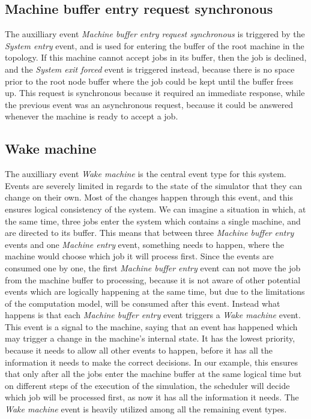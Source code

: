 \subsection{Machine buffer entry request synchronous}
The auxilliary event \textit{Machine buffer entry request synchronous} is triggered by the \textit{System entry} event, and is used for entering the buffer of the root machine in the topology. If this machine cannot accept jobs in its buffer, then the job is declined, and the \textit{System exit forced} event is triggered instead, because there is no space prior to the root node buffer where the job could be kept until the buffer frees up. This request is synchronous because it required an immediate response, while the previous event was an asynchronous request, because it could be answered whenever the machine is ready to accept a job.

\subsection{Wake machine}
The auxilliary event \textit{Wake machine} is the central event type for this system. Events are severely limited in regards to the state of the simulator that they can change on their own. Most of the changes happen through this event, and this ensures logical consistency of the system. We can imagine a situation in which, at the same time, three jobs enter the system which contains a single machine, and are directed to its buffer. This means that between three \textit{Machine buffer entry} events and one \textit{Machine entry} event, something needs to happen, where the machine would choose which job it will process first. Since the events are consumed one by one, the first \textit{Machine buffer entry} event can not move the job from the machine buffer to processing, because it is not aware of other potential events which are logically happening at the same time, but due to the limitations of the computation model, will be consumed after this event. Instead what happens is that each \textit{Machine buffer entry} event triggers a \textit{Wake machine} event. This event is a signal to the machine, saying that an event has happened which may trigger a change in the machine's internal state. It has the lowest priority, because it needs to allow all other events to happen, before it has all the information it needs to make the correct decisions. In our example, this ensures that only after all the jobs enter the machine buffer at the same logical time but on different steps of the execution of the simulation, the scheduler will decide which job will be processed first, as now it has all the information it needs. The \textit{Wake machine} event is heavily utilized among all the remaining event types.

